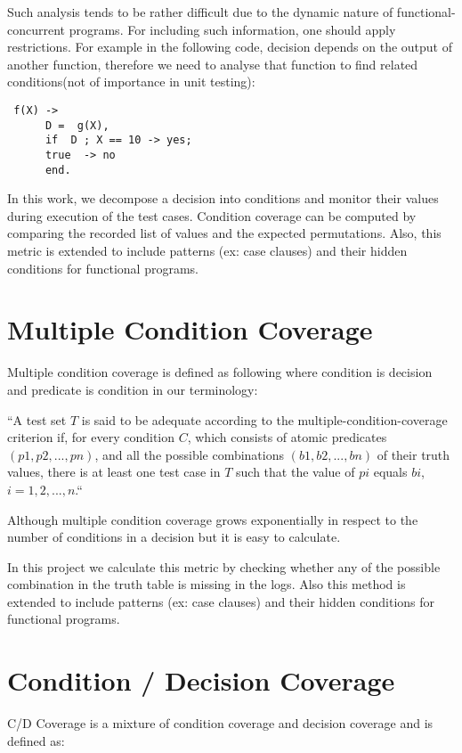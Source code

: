 \documentclass[12pt,a4paper]{report}
\begin{document}
Such analysis tends to be rather difficult due to the dynamic nature of functional-concurrent programs. For including such information, one should apply
 restrictions. For example in the following code, decision depends on the output of another function, therefore we need to analyse that function to find
 related conditions(not of importance in unit testing):

\begin{lstlisting}
 f(X) -> 
      D =  g(X),
      if  D ; X == 10 -> yes;
	  true  -> no
      end.
\end{lstlisting}

In this work, we decompose a decision into conditions and monitor their values during execution of the test cases. Condition coverage can be computed
 by comparing the recorded list of values and the expected permutations. Also, this metric is extended to include patterns (ex: case clauses) and their
 hidden conditions for functional programs. %

\section{Multiple Condition Coverage}
Multiple condition coverage is defined as following where condition is decision and predicate is condition in our terminology:

“A test set $T$ is said to be adequate according to the multiple-condition-coverage criterion if, for every condition $C$, which consists of atomic
 predicates $(p1, p2,  . . .  , pn)$, and all the possible combinations $(b1, b2,  . . .  , bn)$ of their truth values, there is at least one test case in
 $T$ such that the value of $pi$ equals $bi$, $i = 1, 2,  .  .  .  , n$.“\cite{Zhu:1997:SUT:267580.267590}

Although multiple condition coverage grows exponentially in respect to the number of conditions in a decision but it is easy to calculate.

In this project we calculate this metric by checking whether any of the possible combination in the truth table is missing in the logs. Also this method is
 extended to include patterns (ex: case clauses) and their hidden conditions for functional programs.

\section{Condition / Decision Coverage}
C/D Coverage is a mixture of condition coverage and decision coverage and is defined as:
\end{document}
